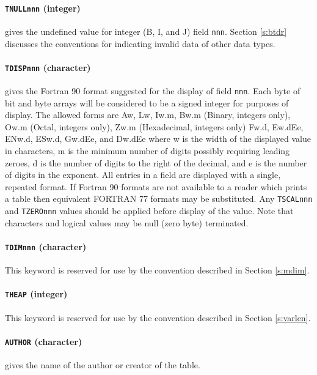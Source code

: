\paragraph {{\tt TNULLnnn} (integer)} gives 
the undefined value 
for integer (B, I, and J) field {\tt nnn}.  
Section \ref{s:btdr} discusses the conventions for indicating
invalid data of other data types.

\paragraph {{\tt TDISPnnn} (character)} gives 
the Fortran 90 format suggested for the display 
of field {\tt nnn}.  Each byte of bit and byte arrays will be
considered to be a signed integer for purposes of display.  The allowed
forms are Aw, Lw, Iw.m, Bw.m (Binary, integers only), Ow.m (Octal, 
integers only), Zw.m (Hexadecimal, integers only) Fw.d, Ew.dEe, ENw.d, 
ESw.d,  Gw.dEe, and Dw.dEe where w is the width of 
the displayed value in characters, m is the minimum number of digits
possibly requiring leading zeroes, d is the number of digits to the
right of the decimal, and e is the number of digits in the exponent.
All entries in a field are displayed with a single, repeated format.
If Fortran 90 formats 
are not available to a reader which prints
a table then equivalent FORTRAN 77 formats may be substituted.
Any {\tt TSCALnnn} and 
{\tt TZEROnnn} values should be applied before display
of the
value.  Note that characters and logical values may be null (zero
byte) terminated.

\paragraph {{\tt TDIMnnn} (character)} This 
keyword is reserved for use by the convention described in 
Section \ref{s:mdim}.

\paragraph {{\tt THEAP} (integer)} This 
keyword is reserved for use by the
convention described in Section \ref{s:varlen}.

\paragraph {{\tt AUTHOR} (character)} gives 
the name of the author or creator of the table.

